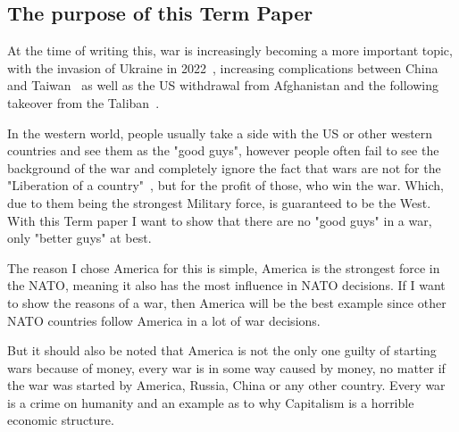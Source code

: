 \subsection{The purpose of this Term Paper}
At the time of writing this, war is increasingly becoming a more important topic, with the invasion of Ukraine in 2022~\autocite{bbc-invasion-ukraine}, increasing complications between China and Taiwan~\autocite{bbc-china-taiwan} as well as the US withdrawal from Afghanistan and the following takeover from the Taliban~\autocite{cfr-afghanistan}.

In the western world, people usually take a side with the US or other western countries and see them as the "good guys", however people often fail to see the background of the war and completely ignore the fact that  wars are not for the "Liberation of a country"~\autocite{george-bush-liberation-iraq}, but for the profit of those, who win the war. Which, due to them being the strongest Military force, is guaranteed to be the West.
With this Term paper I want to show that there are no "good guys" in a war, only "better guys" at best.

The reason I chose America for this is simple, America is the strongest force in the NATO\autocite{statista-nato-aircraft-strength}, meaning it also has the most influence in NATO decisions. If I want to show the reasons of a war, then America will be the best example since other NATO countries follow America in a lot of war decisions.

But it should also be noted that America is not the only one guilty of starting wars because of money, every war is in some way caused by money, no matter if the war was started by America, Russia, China or any other country. Every war is a crime on humanity and an example as to why Capitalism is a horrible economic structure.